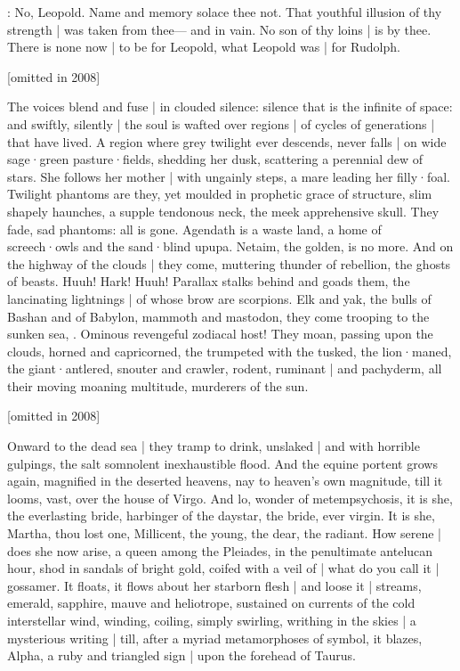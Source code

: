 :
No,
Leopold.
Name and memory solace thee not.
That youthful illusion of thy strength |
was taken from thee---%
and in vain.
No son of thy loins |
is by thee.
There is none now |
to be for Leopold,
what Leopold was |
for Rudolph.

[omitted in 2008]



The voices blend and fuse |
in clouded silence:
silence that is the infinite of space:
and swiftly,
silently |
the soul is wafted over regions |
of cycles of generations |
that have lived.
A region where grey twilight ever descends,
never falls |
on wide sage·green pasture·fields,
shedding her dusk,
scattering a perennial dew of stars.
She follows her mother |
with ungainly steps,
a mare leading her filly·foal.
Twilight phantoms are they,
yet moulded in prophetic grace of structure,
slim shapely haunches,
a supple tendonous neck,
the meek apprehensive skull.
They fade,
sad phantoms:
all is gone.
Agendath is a waste land,
a home of screech·owls and the sand·blind upupa.
Netaim,
the golden,
is no more.
And on the highway of the clouds |
they come,
muttering thunder of rebellion,
the ghosts of beasts.
Huuh!
Hark!
Huuh!
Parallax stalks behind and goads them,
the lancinating lightnings |
of whose brow are scorpions.
Elk and yak,
the bulls of Bashan and of Babylon,
mammoth and mastodon,
they come trooping to the sunken sea,
.
Ominous revengeful zodiacal host!
They moan,
passing upon the clouds,
horned and capricorned,
the trumpeted with the tusked,
the lion·maned,
the giant·antlered,
snouter and crawler,
rodent,
ruminant |
and pachyderm,
all their moving moaning multitude,
murderers of the sun.


[omitted in 2008]

Onward to the dead sea |
they tramp to drink,
unslaked |
and with horrible gulpings,
the salt somnolent inexhaustible flood.
And the equine portent grows again,
magnified in the deserted heavens,
nay to heaven's own magnitude,
till it looms,
vast,
over the house of Virgo.
And lo,
wonder of metempsychosis,
it is she,
the everlasting bride,
harbinger of the daystar,
the bride,
ever virgin.
It is she,
Martha,
thou lost one,
Millicent,
the young,
the dear,
the radiant.
How serene |
does she now arise,
a queen among the Pleiades,
in the penultimate antelucan hour,
shod in sandals of bright gold,
coifed with a veil of |
what do you call it |
gossamer.
It floats,
it flows about her starborn flesh |
and loose it |
streams,
emerald,
sapphire,
mauve and heliotrope,
sustained on currents of the cold interstellar wind,
winding,
coiling,
simply swirling,
writhing in the skies |
a mysterious writing |
till,
after a myriad metamorphoses of symbol,
it blazes,
Alpha,
a ruby and triangled sign |
upon the forehead of Taurus.

